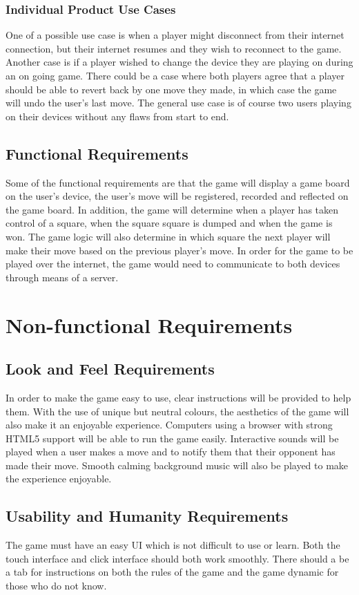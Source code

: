 \documentclass[12pt, titlepage]{article}
\begin{document}
\subsubsection{Individual Product Use Cases}
One of a possible use case is when a player might disconnect from their
internet connection, but their internet resumes and they wish to reconnect to
the game. Another case is if a player wished to change the device they are
playing on during an on going game. There could be a case where both players
agree that a player should be able to revert back by one move they made, in
which case the game will undo the user's last move. The general use case is of
course two users playing on their devices without any flaws from start to end.

\subsection{Functional Requirements}
Some of the functional requirements are that the game will display a game board
on the user's device, the user's move will be registered, recorded and
reflected on the game board. In addition, the game will determine when a player
has taken control of a square, when the square square is dumped and when the
game is won. The game logic will also determine in which square the next player
will make their move based on the previous player's move. In order for the game
to be played over the internet, the game would need to communicate to both
devices through means of a server.

\section{Non-functional Requirements}

\subsection{Look and Feel Requirements}
In order to make the game easy to use, clear instructions will be provided to
help them. With the use of unique but neutral colours, the aesthetics of the
game will also make it an enjoyable experience. Computers using a browser with
strong HTML5 support will be able to run the game easily. Interactive sounds
will be played when a user makes a move and to notify them that their opponent
has made their move. Smooth calming background music will also be played to make
the experience enjoyable.

\subsection{Usability and Humanity Requirements}
The game must have an easy UI which is not difficult to use or learn. Both the
touch interface and click interface should both work smoothly. There should a be
a tab for instructions on both the rules of the game and the game dynamic for 
those who do not know.
\end{document}
